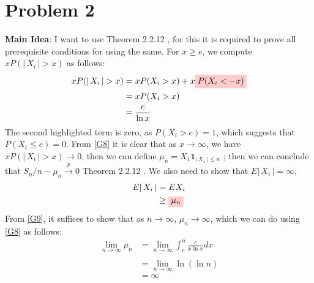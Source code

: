 \documentclass{article}
\newcommand{\highlight}[1]{%
  \colorbox{red!20}{$\displaystyle#1$}}
\newcommand{\abs}[1]{\vert \, #1 \, \vert}
\begin{document}
\section{Problem 2}
\textbf{Main Idea}: I want to use Theorem 2.2.12 \cite{10.5555/1869916}, for this it is required to prove all prerequisite conditions for using the same. For $x \geq e$, we compute $x P( \abs{X_i} > x)$ as follows: 
\begin{equation}
    \label{G8}
    \begin{split}
        xP( \abs{X_i} > x) &= xP(X_i > x) + x\highlight{P(X_i < -x)}\\
        &= xP(X_i > x)\\
        &= \frac{e}{\ln{x}}
    \end{split}
\end{equation}
The second highlighted term is zero, as $P(X_i > e) = 1$, which suggests that $P(X_i \leq e ) = 0$. From \ref{G8} it is clear that as $x \rightarrow \infty$, we have $xP( \abs{X_i} > x) \rightarrow 0$, then we can define $\mu_n = X_1\mathbf{1}_{\abs{X_1}\leq n}$ ; then we can conclude that $S_n/n - \mu_n \xrightarrow{p} 0$ Theorem 2.2.12 \cite{10.5555/1869916}. We also need to show that $E\abs{X_i} = \infty$, 
\begin{equation}
    \label{G9}
    \begin{split}
        E\abs{X_i} &= EX_i \\
        &\geq \highlight{\mu_n}
    \end{split}
\end{equation}
From \ref{G9}, it suffices to show that as $n \rightarrow \infty$, $\mu_n \rightarrow \infty$, which we can do using  \ref{G8} as follows: 
\begin{equation}
    \label{G10}
    \begin{split}
        \lim_{n\rightarrow \infty} \mu_n &= \lim_{n\rightarrow \infty}\int_{e}^{n} \frac{e}{x \ln{x}} dx\\\\
        &= \lim_{n\rightarrow \infty} \ln{(\ln{n})}\\
        &= \infty
    \end{split}
\end{equation}
\newpage 
\end{document}
